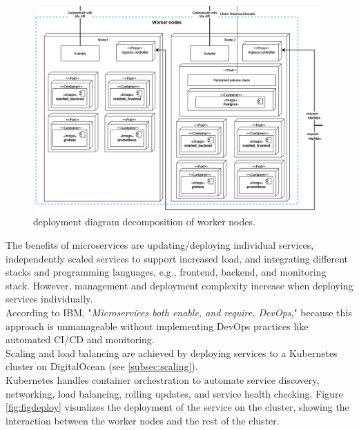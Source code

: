 \begin{figure}[H]
    \centering
    \includegraphics[scale=0.43]{images/deployment_diagrams/devopsdiagrams-deployment worker nodes.drawio(3).png}
    \caption{\mini deployment diagram decomposition of worker nodes.}
    \label{fig:figdeployworker}
\end{figure}
The benefits of microservices are updating/deploying individual services, independently scaled services to support increased load, and integrating different stacks and programming languages, e.g., frontend, backend, and monitoring stack. However, management and deployment complexity increase when deploying services individually.\\
According to IBM, "\textit{Microservices both enable, and require, DevOps}," because this approach is unmanageable without implementing DevOps practices like automated CI/CD and monitoring\cite{microservices}.\\
Scaling and load balancing are achieved by deploying services to a Kubernetes cluster on DigitalOcean (see \ref{subsec:scaling}).\\
Kubernetes handles container orchestration to automate service discovery, networking, load balancing, rolling updates, and service health checking. Figure \ref{fig:figdeploy} visualizes the deployment of the \mini service on the cluster, showing the interaction between the worker nodes and the rest of the cluster.
